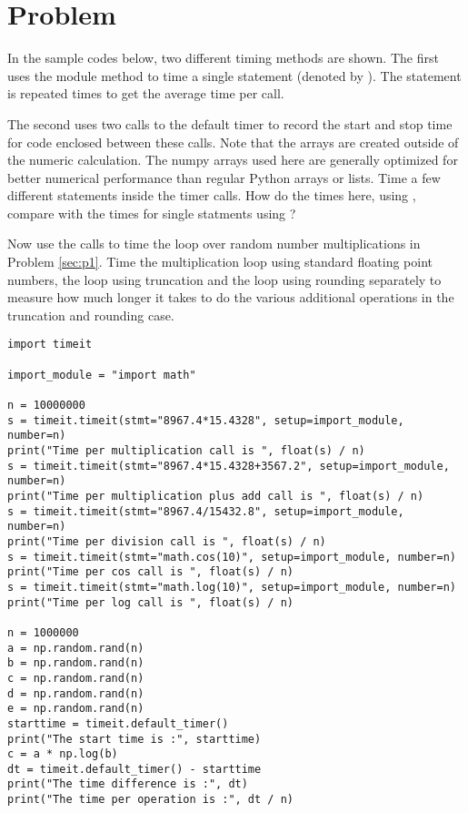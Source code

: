 \section{Problem \thesection}

In the sample codes below, two different timing methods are shown. The first uses the
 module method  to time a single statement (denoted by
). The statement is repeated  times to get the average time per call.

The second uses two calls to the default timer to record the start and stop time for code
enclosed between these calls. Note that the arrays are created outside of the numeric
calculation. The numpy arrays used here are generally optimized for better numerical
performance than regular Python arrays or lists. Time a few different statements inside the
timer calls. How do the times here, using , compare with the times for single
statments using ?

Now use the  calls to time the loop over random number
multiplications in Problem \ref{sec:p1}. Time the multiplication loop using standard
floating point numbers, the loop using truncation and the loop using rounding separately to
measure how much longer it takes to do the various additional operations in the truncation
and rounding case.

\begin{verbatim}
import timeit

import_module = "import math"

n = 10000000
s = timeit.timeit(stmt="8967.4*15.4328", setup=import_module, number=n)
print("Time per multiplication call is ", float(s) / n)
s = timeit.timeit(stmt="8967.4*15.4328+3567.2", setup=import_module, number=n)
print("Time per multiplication plus add call is ", float(s) / n)
s = timeit.timeit(stmt="8967.4/15432.8", setup=import_module, number=n)
print("Time per division call is ", float(s) / n)
s = timeit.timeit(stmt="math.cos(10)", setup=import_module, number=n)
print("Time per cos call is ", float(s) / n)
s = timeit.timeit(stmt="math.log(10)", setup=import_module, number=n)
print("Time per log call is ", float(s) / n)

n = 1000000
a = np.random.rand(n)
b = np.random.rand(n)
c = np.random.rand(n)
d = np.random.rand(n)
e = np.random.rand(n)
starttime = timeit.default_timer()
print("The start time is :", starttime)
c = a * np.log(b)
dt = timeit.default_timer() - starttime
print("The time difference is :", dt)
print("The time per operation is :", dt / n)
\end{verbatim}
